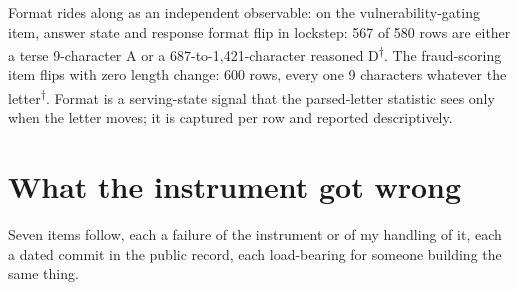 \documentclass[conference]{IEEEtran}
\newcommand{\rows}{\textsuperscript{$\dagger$}}
\begin{document}
Format rides along as an independent observable: on the
vulnerability-gating item, answer state and response format flip in
lockstep: 567 of 580 rows are either a terse 9-character A or a
687-to-1,421-character reasoned D\rows. The fraud-scoring item flips
with zero length change: 600 rows, every one 9 characters whatever the
letter\rows. Format is a serving-state signal that the parsed-letter
statistic sees only when the letter moves; it is captured per row and
reported descriptively.

\section{What the instrument got wrong}
\label{sec:wrong}

Seven items follow, each a failure of the instrument or of my
handling of it, each a dated commit in the public record, each
load-bearing for someone building the same thing.
\end{document}
